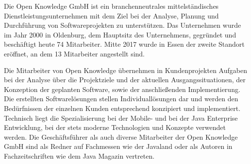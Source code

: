Die Open Knowledge GmbH ist ein branchenneutrales mittelständisches Dienstleistungsunternehmen mit dem Ziel bei der Analyse, Planung und Durchführung von Softwareprojekten zu unterstützen. Das Unternehmen wurde im Jahr 2000 in Oldenburg, dem Hauptsitz des Unternehmens, gegründet und beschäftigt heute 74 Mitarbeiter. Mitte 2017 wurde in Essen der zweite Standort eröffnet, an dem 13 Mitarbeiter angestellt sind.

Die Mitarbeiter von Open Knowledge übernehmen in Kundenprojekten Aufgaben bei der Analyse über die Projektziele und der aktuellen Ausgangssituationen, der Konzeption der geplanten Software, sowie der anschließenden Implementierung. Die erstellten Softwarelösungen stellen Individuallösungen dar und werden den Bedürfnissen der einzelnen Kunden entsprechend konzipiert und implementiert. Technisch liegt die Spezialisierung bei der Mobile- und bei der Java Enterprise Entwicklung, bei der stets moderne Technologien und Konzepte verwendet werden. Die Geschäftsführer als auch diverse Mitarbeiter der Open Knowledge GmbH sind als Redner auf Fachmessen wie der Javaland oder als Autoren in Fachzeitschriften wie dem Java Magazin vertreten.

\pagebreak
